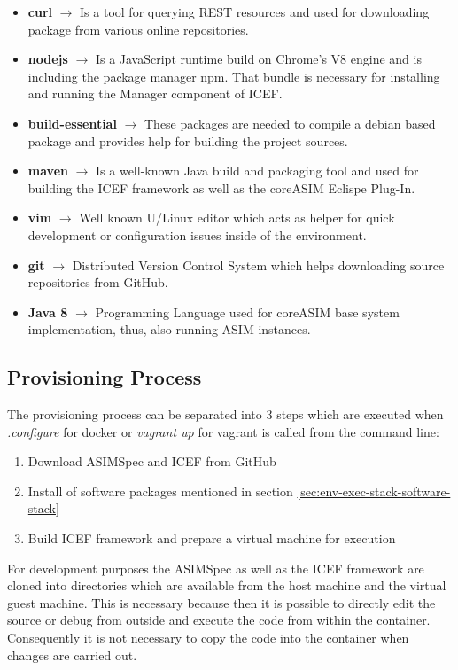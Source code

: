 \begin{itemize}
	\item \textbf{curl} $\rightarrow$ Is a tool for querying REST resources and used for downloading package from various online repositories.
	\item \textbf{nodejs} $\rightarrow$ Is a JavaScript runtime build on Chrome's V8 engine and is including the package manager npm. That bundle is necessary for installing and running the Manager component of ICEF.
	\item \textbf{build-essential} $\rightarrow$ These packages are needed to compile a debian based package and provides help for building the project sources.
	\item \textbf{maven} $\rightarrow$ Is a well-known Java build and packaging tool and used for building the ICEF framework as well as the coreASIM Eclispe Plug-In.
	\item \textbf{vim} $\rightarrow$ Well known U/Linux editor which acts as helper for quick development or configuration issues inside of the environment.
	\item \textbf{git} $\rightarrow$ Distributed Version Control System which helps downloading source repositories from GitHub.
	\item \textbf{Java 8} $\rightarrow$ Programming Language used for coreASIM base system implementation, thus, also running ASIM instances.
\end{itemize}

\subsection{Provisioning Process}

The provisioning process can be separated into 3 steps which are executed when \textit{.\/configure} for docker or \textit{vagrant up} for vagrant is called from the command line:

\begin{enumerate}
	\item Download ASIMSpec and ICEF from GitHub
	\item Install of software packages mentioned in section \ref{sec:env-exec-stack-software-stack}
	\item Build ICEF framework and prepare a virtual machine for execution
\end{enumerate}

For development purposes the ASIMSpec as well as the ICEF framework are cloned into directories which are available from the host machine and the virtual guest machine. This is necessary because then it is possible to directly edit the source or debug from outside and execute the code from within the container. Consequently it is not necessary to copy the code into the container when changes are carried out.

